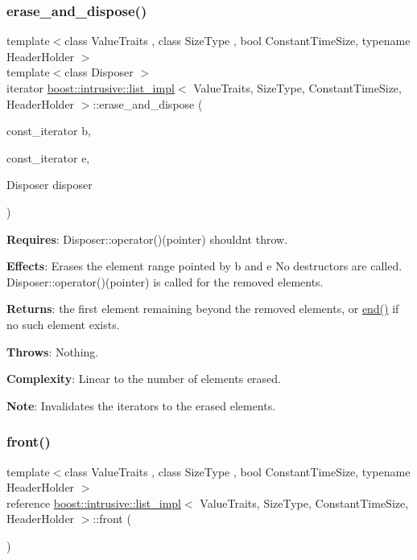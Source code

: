 \subsubsection{\texorpdfstring{erase\+\_\+and\+\_\+dispose()}{erase\_and\_dispose()}\hspace{0.1cm}{\footnotesize\ttfamily [2/2]}}
{\footnotesize\ttfamily template$<$class Value\+Traits , class Size\+Type , bool Constant\+Time\+Size, typename Header\+Holder $>$ \\
template$<$class Disposer $>$ \\
iterator \hyperlink{classboost_1_1intrusive_1_1list__impl}{boost\+::intrusive\+::list\+\_\+impl}$<$ Value\+Traits, Size\+Type, Constant\+Time\+Size, Header\+Holder $>$\+::erase\+\_\+and\+\_\+dispose (\begin{DoxyParamCaption}\item[{const\+\_\+iterator}]{b,  }\item[{const\+\_\+iterator}]{e,  }\item[{Disposer}]{disposer }\end{DoxyParamCaption})\hspace{0.3cm}{\ttfamily [inline]}}

{\bfseries Requires}\+: Disposer\+::operator()(pointer) shouldn\textquotesingle{}t throw.

{\bfseries Effects}\+: Erases the element range pointed by b and e No destructors are called. Disposer\+::operator()(pointer) is called for the removed elements.

{\bfseries Returns}\+: the first element remaining beyond the removed elements, or \hyperlink{classboost_1_1intrusive_1_1list__impl_af2a454471fced6d4b2fb899c50bbee67}{end()} if no such element exists.

{\bfseries Throws}\+: Nothing.

{\bfseries Complexity}\+: Linear to the number of elements erased.

{\bfseries Note}\+: Invalidates the iterators to the erased elements. \mbox{\label{classboost_1_1intrusive_1_1list__impl_adfff2fc56d86000cced59427fecf0e90}} 
\subsubsection{\texorpdfstring{front()}{front()}\hspace{0.1cm}{\footnotesize\ttfamily [1/2]}}
{\footnotesize\ttfamily template$<$class Value\+Traits , class Size\+Type , bool Constant\+Time\+Size, typename Header\+Holder $>$ \\
reference \hyperlink{classboost_1_1intrusive_1_1list__impl}{boost\+::intrusive\+::list\+\_\+impl}$<$ Value\+Traits, Size\+Type, Constant\+Time\+Size, Header\+Holder $>$\+::front (\begin{DoxyParamCaption}{ }\end{DoxyParamCaption})\hspace{0.3cm}{\ttfamily [inline]}}


